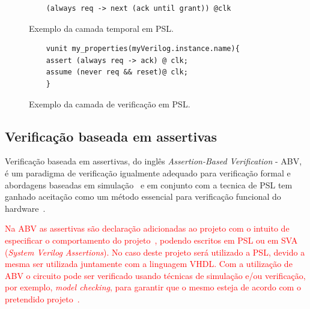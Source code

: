\begin{figure}[H]
\caption{\label{fig:psl_example2} Exemplo da camada temporal em PSL.}
	\begin{center}
    \begin{minipage}{0.7\textwidth}
    \begin{lstlisting}       
    (always req -> next (ack until grant)) @clk
    \end{lstlisting}
    \end{minipage}
	\end{center}
\end{figure}

\begin{figure}[H]
\caption{\label{fig:psl_example3} Exemplo da camada de verificação em PSL.}
	\begin{center}
    \begin{minipage}{0.7\textwidth}
    \begin{lstlisting}       
    vunit my_properties(myVerilog.instance.name){
    assert (always req -> ack) @ clk;
    assume (never req && reset)@ clk;
    }
    \end{lstlisting}
    \end{minipage}
	\end{center}
\end{figure}


\subsection{Verificação baseada em assertivas}

Verificação baseada em assertivas, do inglês \textit{Assertion-Based Verification} - ABV, é um paradigma de verificação igualmente adequado para verificação formal e abordagens baseadas em simulação~\cite{boule2005incorporating} e em conjunto com a tecnica de PSL tem ganhado aceitação como um método essencial para verificação funcional do hardware~\cite{DahanCombining}.

\par
\textcolor{red}{Na ABV as assertivas são declaração adicionadas ao projeto com o intuito de especificar o comportamento do projeto~\cite{boule2005incorporating}, podendo escritos em PSL ou em SVA (\textit{System Verilog Assertions}). No caso deste projeto será utilizado a PSL, devido a mesma ser utilizada juntamente com a linguagem VHDL. Com a utilização de ABV o circuito pode ser verificado usando técnicas de simulação e/ou verificação, por exemplo, \textit{model checking}, para garantir que o mesmo esteja de acordo com o pretendido projeto~\cite{DahanCombining}.}

